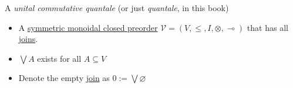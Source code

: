 A \emph{unital commutative quantale} (or just \emph{quantale}, in this book)

\begin{itemize}
    \item  A \hyperref[D2.79]{symmetric monoidal closed preorder} $\mathcal{V}=(V,\leq,I,\otimes,\multimap)$ that has all \hyperref[D1.81]{joins}.
    \item $\bigvee A$ exists for all $A \subseteq V$
    \item Denote the empty \hyperref[D1.81]{join} as $0 := \bigvee \varnothing$
  \end{itemize}
